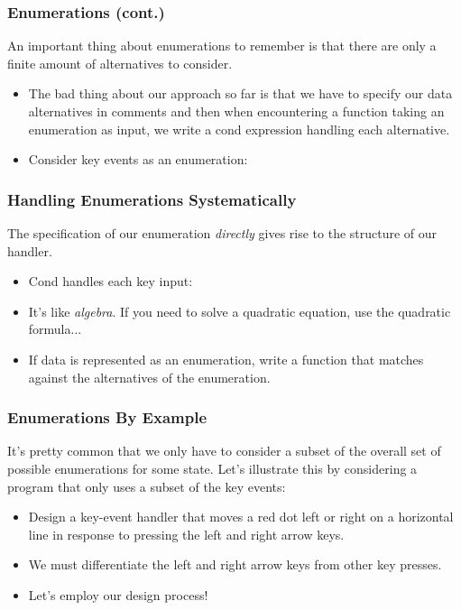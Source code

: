 \documentclass{beamer}
\begin{document}



\begin{frame}
  \frametitle{Enumerations (cont.)}
  An important thing about enumerations to remember is that there are
  only a finite amount of alternatives to consider. 
  \begin{itemize}
  \item<2-> The bad thing about our approach so far is that
    we have to specify our data alternatives in comments and then
    when encountering a function taking an enumeration as input, we
    write a cond expression handling each alternative.
  \item<3-> Consider key events as an enumeration:
    \keyEnum
  \end{itemize}
\end{frame}


\begin{frame}
  \frametitle{Handling Enumerations Systematically}
  The specification of our enumeration \emph{directly} gives rise
  to the structure of our handler.
  \begin{itemize}
  \item<2-> Cond handles each key input:
    \keHandler
  \item<3-> It's like \emph{algebra}. If you need to solve a quadratic
    equation, use the quadratic formula...
  \item<4-> If data is represented as an enumeration, write a function
    that matches against the alternatives of the enumeration.
  \end{itemize}
\end{frame}

\begin{frame}
  \frametitle{Enumerations By Example}
  It's pretty common that we only have to consider a subset of the
  overall set of possible enumerations for some state. Let's illustrate
  this by considering a program that only uses a subset of the key events:
  \begin{itemize}
  \item<2-> Design a key-event handler that moves a red dot left or right on a horizontal line in response to pressing the left and right arrow keys.
  \item<3-> We must differentiate the left and right arrow keys from
    other key presses.
  \item<4-> Let's employ our design process!
  \end{itemize}
\end{frame}
\end{document}

